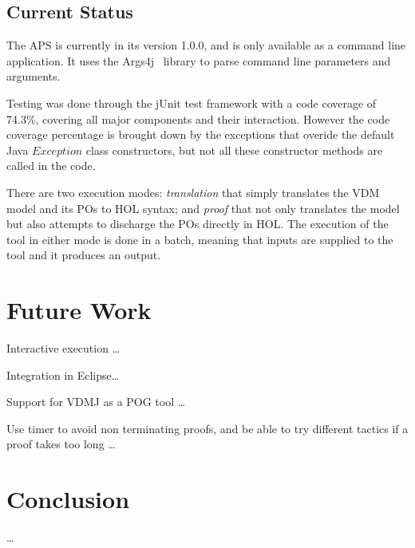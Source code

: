 \documentclass[]{article}
\begin{document}
\subsection{Current Status}

The APS is currently in its version 1.0.0, and is only available as a command line application.
It uses the Args4j~ library to parse command line parameters and arguments.

Testing was done through the jUnit test framework with a code coverage of 74.3\%, covering all major components and their interaction.
However the code coverage percentage is brought down by the exceptions that overide the default Java $Exception$ class constructors, but not all these constructor methods are called in the code.

There are two execution modes: \emph{translation} that simply translates the VDM model and its POs to HOL syntax; and \emph{proof} that not only translates the model but also attempts to discharge the POs directly in HOL.
The execution of the tool in either mode is done in a batch, meaning that inputs are supplied to the tool and it produces an output.

\section{Future Work}
\label{sec:future_work}

Interactive execution \ldots

Integration in Eclipse\ldots

Support for VDMJ as a POG tool \ldots

Use timer to avoid non terminating proofs, and be able to try different tactics if a proof takes too long \ldots


\section{Conclusion}
\label{sec:conclusion}

\ldots
\end{document}
